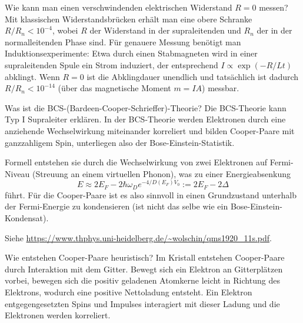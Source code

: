 
\begin{fquestion}{Wie kann man einen verschwindenden elektrischen Widerstand $R = 0$ messen?}
    Mit klassischen Widerstandsbrücken erhält man eine obere Schranke $R / R_n < 10^{-4}$, wobei $R$ der Widerstand in der supraleitenden und $R_n$ der in der normalleitenden Phase sind.
    Für genauere Messung benötigt man Induktionsexperimente: Etwa durch einen Stabmagneten wird in einer supraleitenden Spule ein Strom induziert, der entsprechend $ I \propto \exp \left(-R/L t\right)$ abklingt. 
    Wenn $R= 0$ ist die Abklingdauer unendlich und tatsächlich ist dadurch $R / R_n < 10^{-14}$ (über das magnetische Moment $m = I A$) messbar.
\end{fquestion}

\begin{fquestion}{Was ist die BCS-(Bardeen-Cooper-Schrieffer)-Theorie? }
    Die BCS-Theorie kann Typ I Supraleiter erklären. 
    In der BCS-Theorie werden Elektronen durch eine anziehende Wechselwirkung miteinander korreliert und bilden Cooper-Paare mit ganzzahligem Spin, unterliegen also der Bose-Einstein-Statistik. 
    
    Formell entstehen sie durch die Wechselwirkung von zwei Elektronen auf Fermi-Niveau (Streuung  an einem virtuellen Phonon), was zu einer Energieabsenkung 
    \[E \approx 2 E_F - 2 \hbar \omega_D e^{-4 / D(E_F) V_0} := 2 E_F - 2 \Delta\]
    führt.
    Für die Cooper-Paare ist es also sinnvoll in einen Grundzustand unterhalb der Fermi-Energie zu kondensieren (ist nicht das selbe wie ein Bose-Einstein-Kondensat).

    Siehe \url{https://www.thphys.uni-heidelberg.de/~wolschin/qms1920_11s.pdf}.
\end{fquestion}

\begin{fquestion}{Wie entstehen Cooper-Paare heuristisch?}
    Im Kristall entstehen Cooper-Paare durch Interaktion mit dem Gitter.
    Bewegt sich ein Elektron an Gitterplätzen vorbei, bewegen sich die positiv geladenen Atomkerne leicht in Richtung des Elektrons, wodurch eine positive Nettoladung entsteht.
    Ein Elektron entgegengesetzten Spins und Impulses interagiert mit dieser Ladung und die Elektronen werden korreliert.
\end{fquestion}

